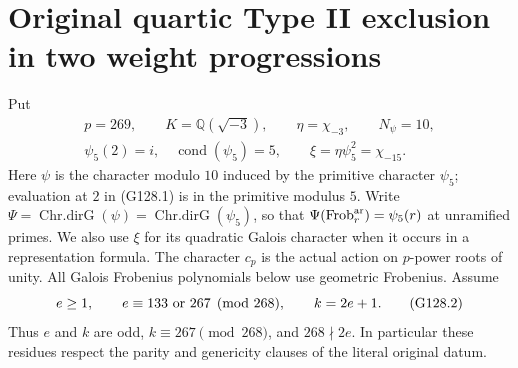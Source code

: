 \section{Original quartic Type II exclusion in two weight progressions}
\label{sec:cubic-original-quartic-typeii-exclusion}

Put
\[
 \begin{gathered}
 p=269,\qquad K=\mathbb Q(\sqrt{-3}),\qquad
 \eta=\chi_{-3},\qquad N_\psi=10,\\
 \psi_5(2)=i,\quad\operatorname{cond}(\psi_5)=5,\qquad
 \xi=\eta\psi_5^2=\chi_{-15}.
 \end{gathered}
 \tag{G128.1}
\]
Here \(\psi\) is the character modulo \(10\) induced by the
primitive character \(\psi_5\); evaluation at \(2\) in (G128.1)
is in the primitive modulus \(5\).  Write
\(\Psi=\operatorname{Chr.dirG}(\psi)=\operatorname{Chr.dirG}(\psi_5)\),
so that \(\Psi(\operatorname{Frob}^{\rm ar}_r)=\psi_5(r)\) at
unramified primes.  We also use \(\xi\) for its quadratic Galois
character when it occurs in a representation formula.
The character \(c_p\) is the actual action on
\(p\)-power roots of unity.  All Galois Frobenius polynomials below
use geometric Frobenius.  Assume
\[
                  e\ge1,\qquad
                  e\equiv133\ \hbox{or}\ 267\pmod{268},
                  \qquad k=2e+1.
 \tag{G128.2}
\]
Thus \(e\) and \(k\) are odd, \(k\equiv267\pmod{268}\), and
\(268\nmid2e\).  In particular these residues respect the parity
and genericity clauses of the literal original datum.

